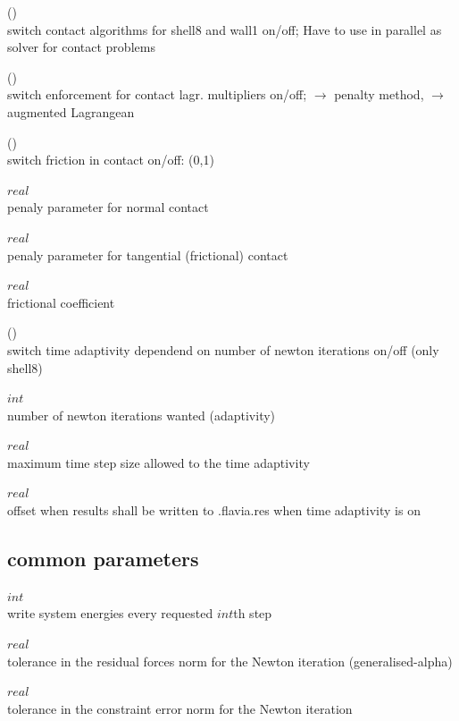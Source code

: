  (\kor{})\\
switch contact algorithms for shell8 and wall1 on/off;
Have to use  in parallel as solver for contact problems

 (\kor{})\\
switch enforcement for contact lagr. multipliers on/off;
 $\to$ penalty method,  $\to$ augmented Lagrangean

 (\kor{})\\
switch friction in contact on/off: (0,1)

 $real$\\
penaly parameter for normal contact

 $real$\\
penaly parameter for tangential (frictional) contact

 $real$\\
frictional coefficient

 (\kor{})\\
switch time adaptivity dependend on number of newton iterations on/off (only shell8)

 $int$\\
number of newton iterations wanted (adaptivity)

 $real$\\
maximum time step size allowed to the time adaptivity

 $real$\\
offset when results shall be written to .flavia.res when time adaptivity is on

\subsection{\baci{} common parameters}

 $int$\\
write system energies every requested $int$th step

 $real$\\
tolerance in the residual forces norm for the Newton iteration (generalised-alpha)

 $real$\\
tolerance in the constraint error norm for the Newton iteration

